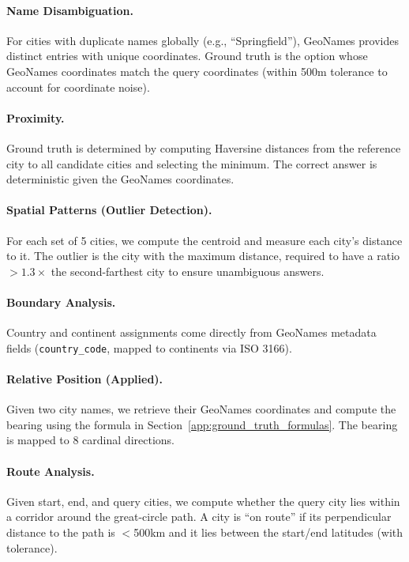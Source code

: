 \paragraph{Name Disambiguation.}
For cities with duplicate names globally (e.g., ``Springfield''), GeoNames provides distinct entries with unique coordinates. Ground truth is the option whose GeoNames coordinates match the query coordinates (within 500m tolerance to account for coordinate noise).

\paragraph{Proximity.}
Ground truth is determined by computing Haversine distances from the reference city to all candidate cities and selecting the minimum. The correct answer is deterministic given the GeoNames coordinates.

\paragraph{Spatial Patterns (Outlier Detection).}
For each set of 5 cities, we compute the centroid and measure each city's distance to it. The outlier is the city with the maximum distance, required to have a ratio $>1.3\times$ the second-farthest city to ensure unambiguous answers.

\paragraph{Boundary Analysis.}
Country and continent assignments come directly from GeoNames metadata fields (\texttt{country\_code}, mapped to continents via ISO 3166).

\paragraph{Relative Position (Applied).}
Given two city names, we retrieve their GeoNames coordinates and compute the bearing using the formula in Section~\ref{app:ground_truth_formulas}. The bearing is mapped to 8 cardinal directions.

\paragraph{Route Analysis.}
Given start, end, and query cities, we compute whether the query city lies within a corridor around the great-circle path. A city is ``on route'' if its perpendicular distance to the path is $<$500km and it lies between the start/end latitudes (with tolerance).

